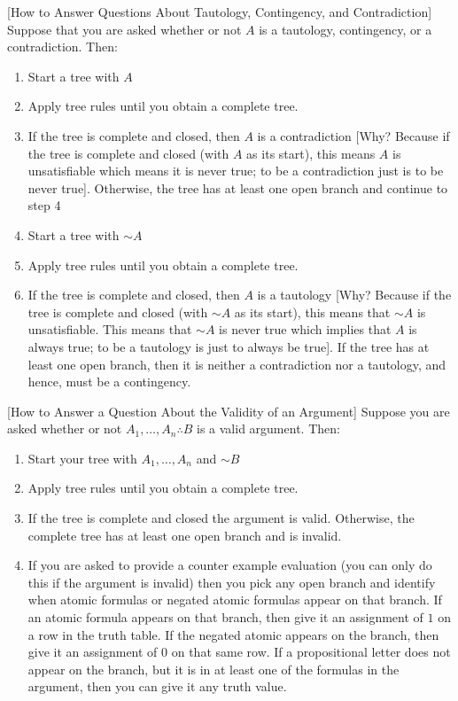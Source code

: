 \documentclass[
]{book}
\providecommand{\tightlist}{%
  \setlength{\itemsep}{0pt}\setlength{\parskip}{0pt}}
\begin{document}
{[}How to Answer Questions About Tautology, Contingency, and Contradiction{]} Suppose that you are asked whether or not \(A\) is a tautology, contingency, or a contradiction. Then:

\begin{enumerate}
\def\labelenumi{\arabic{enumi}.}
\tightlist
\item
  Start a tree with \(A\)
\item
  Apply tree rules until you obtain a complete tree.
\item
  If the tree is complete and closed, then \(A\) is a contradiction {[}Why? Because if the tree is complete and closed (with \(A\) as its start), this means \(A\) is unsatisfiable which means it is never true; to be a contradiction just is to be never true{]}. Otherwise, the tree has at least one open branch and continue to step 4
\item
  Start a tree with \(\sim A\)
\item
  Apply tree rules until you obtain a complete tree.
\item
  If the tree is complete and closed, then \(A\) is a tautology {[}Why? Because if the tree is complete and closed (with \(\sim A\) as its start), this means that \(\sim A\) is unsatisfiable. This means that \(\sim A\) is never true which implies that \(A\) is always true; to be a tautology is just to always be true{]}. If the tree has at least one open branch, then it is neither a contradiction nor a tautology, and hence, must be a contingency.
\end{enumerate}

{[}How to Answer a Question About the Validity of an Argument{]} Suppose you are asked whether or not \(A_1,\ldots,A_n \therefore B\) is a valid argument. Then:

\begin{enumerate}
\def\labelenumi{\arabic{enumi}.}
\tightlist
\item
  Start your tree with \(A_1,\ldots,A_n\) and \(\sim B\)
\item
  Apply tree rules until you obtain a complete tree.
\item
  If the tree is complete and closed the argument is valid. Otherwise, the complete tree has at least one open branch and is invalid.
\item
  If you are asked to provide a counter example evaluation (you can only do this if the argument is invalid) then you pick any open branch and identify when atomic formulas or negated atomic formulas appear on that branch. If an atomic formula appears on that branch, then give it an assignment of \(1\) on a row in the truth table. If the negated atomic appears on the branch, then give it an assignment of \(0\) on that same row. If a propositional letter does not appear on the branch, but it is in at least one of the formulas in the argument, then you can give it any truth value.
\end{enumerate}
\end{document}
